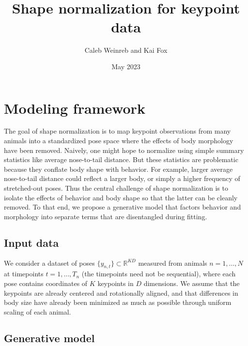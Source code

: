 \documentclass{article}         %
\title{Shape normalization for keypoint data}
\author{Caleb Weinreb and Kai Fox}
\date{May 2023}
\begin{document}
\maketitle

\section{Modeling framework}
\label{sec:model-fwk}

The goal of shape normalization is to map keypoint observations from many animals into a standardized pose space where the effects of body morphology have been removed. Naively, one might hope to normalize using simple summary statistics like average nose-to-tail distance. But these statistics are problematic because they conflate body shape with behavior. For example, larger average nose-to-tail distance could reflect a larger body, or simply a higher frequency of stretched-out poses. Thus the central challenge of shape normalization is to isolate the effects of behavior and body shape so that the latter can be cleanly removed. To that end, we propose a generative model that factors behavior and morphology into separate terms that are disentangled during fitting.

\subsection{Input data}

We consider a dataset of poses $\{y_{n,t}\} \subset \mathbb{R}^{KD}$ measured from animals $n=1,\dots,N$ at timepoints $t=1,\dots,T_n$ (the timepoints need not be sequential), where each pose contains coordinates of $K$ keypoints in $D$ dimensions. We assume that the keypoints are already centered and rotationally aligned, and that differences in body size have already been minimized as much as possible through uniform scaling of each animal. 

\subsection{Generative model}
\end{document}
